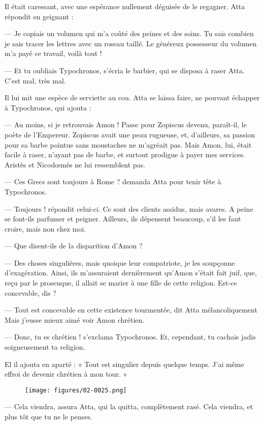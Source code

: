 \documentclass[a4paper, 11pt, oneside, polutonikogreek, french]{article}
\begin{document}
Il était caressant, avec une espérance nullement déguisée de le regagner. Atta répondit en geignant :

--- Je copiais un volumen qui m'a coûté des peines et des soins. Tu sais combien je sais tracer les lettres avec un roseau taillé. Le généreux possesseur du volumen m'a payé ce travail, voilà tout !

--- Et tu oubliais Typochronos, s'écria le barbier, qui se disposa à raser Atta. C'est mal, très mal.

Il lui mit une espèce de serviette au cou. Atta se laissa faire, ne pouvant échapper à Typochronos, qui ajouta :

--- Au moins, si je retrouvais Amon ! Passe pour Zopiscus devenu, paraît-il, le poète de l'Empereur. Zopiscus avait une peau rugueuse, et, d'ailleurs, sa passion pour sa barbe pointue sans moustaches ne m'agréait pas. Mais Amon, lui, était facile à raser, n'ayant pas de barbe, et surtout prodigue à payer mes services. Aristès et Nicodœmès ne lui ressemblent pas.

--- Ces Grecs sont toujours à Rome ? demanda Atta pour tenir tête à Typochronos.

--- Toujours ! répondit celui-ci. Ce sont des clients assidus, mais avares. A peine se font-ils parfumer et peigner. Ailleurs, ils dépensent beaucoup, s'il les faut croire, mais non chez moi.

--- Que disent-ils de la disparition d'Amon ?

--- Des choses singulières, mais quoique leur compatriote, je les soupçonne d'exagération. Ainsi, ils m'assuraient dernièrement qu'Amon s'était fait juif, que, reçu par le proseuque, il allait se marier à une fille de cette religion. Est-ce concevable, dis ?

--- Tout est concevable en cette existence tourmentée, dit Atta mélancoliquement Mais j'eusse mieux aimé voir Amon chrétien.

--- Donc, tu es chrétien ! s'exclama Typochronos. Et, cependant, tu cachais jadis soigneusement ta religion.

El il ajouta en aparté : « Tout est singulier depuis quelque temps. J'ai même effroi de devenir chrétien à mon tour. »
\begin{figure}[H]
\centering
\texttt{[image: figures/02-0025.png]}
\end{figure}
--- Cela viendra, assura Atta, qui la quitta, complètement rasé. Cela viendra, et plus tôt que tu ne le penses.
\end{document}
